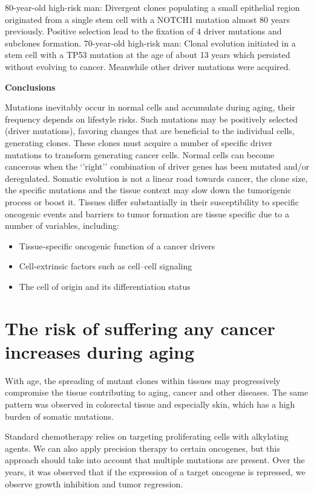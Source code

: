 80-year-old high-risk man: Divergent clones populating a small epithelial region originated from a single stem cell with a NOTCH1 mutation almost 80 years previously. Positive selection lead to the fixation of 4 driver mutations and subclones formation.
70-year-old high-risk man: Clonal evolution initiated in a stem cell with a TP53 mutation at the age of about 13 years which persisted without evolving to cancer. Meanwhile other driver mutations were acquired.

\textbf{Conclusions}

Mutations inevitably occur in normal cells and accumulate during aging, their frequency depends on lifestyle risks. Such mutations may be positively selected (driver mutations), favoring changes that are beneficial to the individual cells, generating clones. These clones must acquire a number of specific driver mutations to transform generating cancer cells. Normal cells can become cancerous when the `'right'' combination of driver genes has been mutated and/or deregulated. Somatic evolution is not a linear road towards cancer, the clone size, the specific mutations and the tissue context may slow down the tumorigenic process or boost it. Tissues differ substantially in their susceptibility to specific oncogenic events and barriers to tumor formation are tissue specific due to a number of variables, including:

\begin{itemize}
\tightlist
\item
  Tissue-specific oncogenic function of a cancer drivers
\item
  Cell-extrinsic factors such as cell--cell signaling
\item
  The cell of origin and its differentiation status
\end{itemize}

\section{The risk of suffering any cancer increases during aging}

With age, the spreading of mutant clones within tissues may progressively compromise the tissue contributing to aging, cancer and other diseases. The same pattern was observed in colorectal tissue and especially skin, which has a high burden of somatic mutations.

Standard chemotherapy relies on targeting proliferating cells with alkylating agents. We can also apply precision therapy to certain oncogenes, but this approach should take into account that multiple mutations are present. Over the years, it was observed that if the expression of a target oncogene is repressed, we observe growth inhibition and tumor regression.

